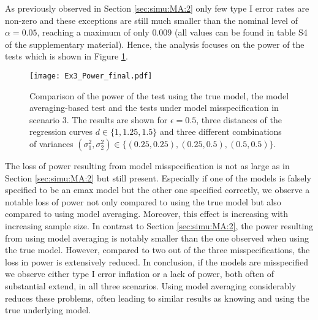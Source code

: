 {As previously observed in Section \ref{sec:simu:MA:2} only few type I error rates are non-zero and these exceptions are still much smaller than the nominal level of $\alpha = 0.05$, reaching a maximum of only $0.009$ (all values can be found in table S4 of the supplementary material). 
Hence, the analysis focuses on the power of the tests which is shown in Figure \ref{fig:Ex3_Power}. 
\begin{figure} 
        \centering
        \texttt{[image: Ex3\_Power\_final.pdf]}
        \caption{Comparison of the power of the test using the true model, the model averaging-based test and the tests under model misspecification in scenario 3. The results are shown for $\epsilon = 0.5$, three distances of the regression curves $d \in \{1, 1.25, 1.5\}$ and three different combinations of variances $(\sigma_1^2, \sigma_2^2) \in \{(0.25, 0.25), (0.25, 0.5), (0.5, 0.5)\}.$}
        \label{fig:Ex3_Power} 
\end{figure}
The loss of power resulting from model misspecification is not as large as in Section \ref{sec:simu:MA:2} but still present. Especially if one of the models is falsely specified to be an emax model but the other one specified correctly, we observe a notable loss of power not only compared to using the true model but also compared to using model averaging.
Moreover, this effect is increasing with increasing sample size.
In contrast to Section \ref{sec:simu:MA:2}, the power resulting from using model averaging is notably smaller than the one observed when using the true model. However, compared to two out of the three misspecifications, the loss in power is extensively reduced.
In conclusion, if the models are misspecified we observe either type I error inflation or a lack of power, both often of substantial extend, in all three scenarios. Using model averaging considerably reduces these problems, often leading to similar results as knowing and using the true underlying model.

}
